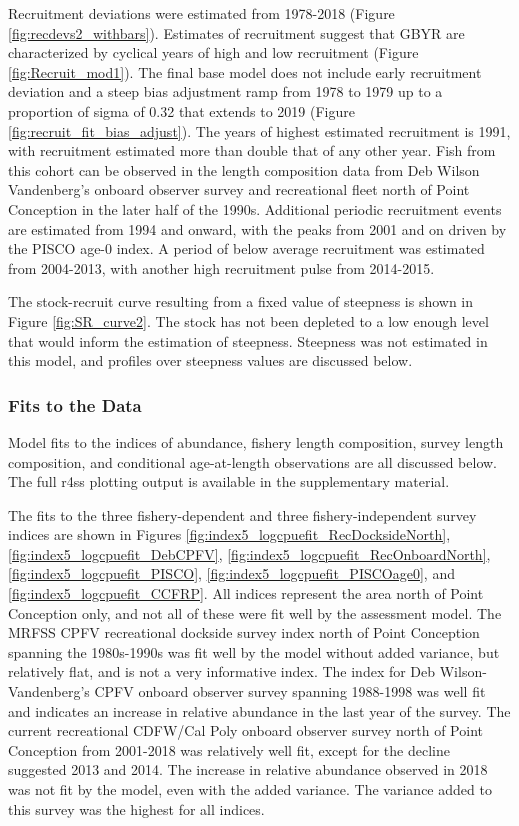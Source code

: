 \documentclass[12pt,]{article}
\begin{document}
Recruitment deviations were estimated from 1978-2018 (Figure
\ref{fig:recdevs2_withbars}). Estimates of recruitment suggest that GBYR
are characterized by cyclical years of high and low recruitment (Figure
\ref{fig:Recruit_mod1}). The final base model does not include early
recruitment deviation and a steep bias adjustment ramp from 1978 to 1979
up to a proportion of sigma of 0.32 that extends to 2019 (Figure
\ref{fig:recruit_fit_bias_adjust}). The years of highest estimated
recruitment is 1991, with recruitment estimated more than double that of
any other year. Fish from this cohort can be observed in the length
composition data from Deb Wilson Vandenberg's onboard observer survey
and recreational fleet north of Point Conception in the later half of
the 1990s. Additional periodic recruitment events are estimated from
1994 and onward, with the peaks from 2001 and on driven by the PISCO
age-0 index. A period of below average recruitment was estimated from
2004-2013, with another high recruitment pulse from 2014-2015.

The stock-recruit curve resulting from a fixed value of steepness is
shown in Figure \ref{fig:SR_curve2}. The stock has not been depleted to
a low enough level that would inform the estimation of steepness.
Steepness was not estimated in this model, and profiles over steepness
values are discussed below.

\subsubsection{Fits to the Data}\label{fits-to-the-data}

Model fits to the indices of abundance, fishery length composition,
survey length composition, and conditional age-at-length observations
are all discussed below. The full r4ss plotting output is available in
the supplementary material.

The fits to the three fishery-dependent and three fishery-independent
survey indices are shown in Figures
\ref{fig:index5_logcpuefit_RecDocksideNorth},
\ref{fig:index5_logcpuefit_DebCPFV},
\ref{fig:index5_logcpuefit_RecOnboardNorth},
\ref{fig:index5_logcpuefit_PISCO},
\ref{fig:index5_logcpuefit_PISCOage0}, and
\ref{fig:index5_logcpuefit_CCFRP}. All indices represent the area north
of Point Conception only, and not all of these were fit well by the
assessment model. The MRFSS CPFV recreational dockside survey index
north of Point Conception spanning the 1980s-1990s was fit well by the
model without added variance, but relatively flat, and is not a very
informative index. The index for Deb Wilson-Vandenberg's CPFV onboard
observer survey spanning 1988-1998 was well fit and indicates an
increase in relative abundance in the last year of the survey. The
current recreational CDFW/Cal Poly onboard observer survey north of
Point Conception from 2001-2018 was relatively well fit, except for the
decline suggested 2013 and 2014. The increase in relative abundance
observed in 2018 was not fit by the model, even with the added variance.
The variance added to this survey was the highest for all indices.
\end{document}
